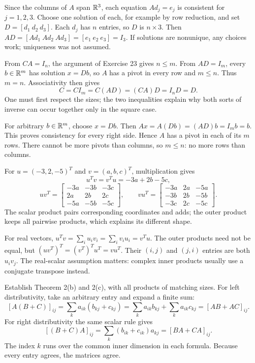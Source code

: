Since the columns of $A$ span $\mathbb{R}^3$, each equation $Ad_j=e_j$ is
consistent for $j=1,2,3$. Choose one solution of each, for example by row
reduction, and set $D=[d_1\ d_2\ d_3]$. Each $d_j$ has $n$ entries,
so $D$ is $n\times3$. Then
$AD=[Ad_1\ Ad_2\ Ad_3]=[e_1\ e_2\ e_3]=I_3$.
If solutions are nonunique, any choices work; uniqueness was not assumed.

From $CA=I_n$, the argument of Exercise 23 gives $n\le m$.
From $AD=I_m$, every $b\in\mathbb{R}^m$ has solution $x=Db$, so $A$ has a pivot
in every row and $m\le n$. Thus $m=n$.
Associativity then gives
\[
 C=C I_m=C(AD)=(CA)D=I_nD=D.
\]
One must first respect the sizes; the two inequalities explain why both
sorts of inverse can occur together only in the square case.

For arbitrary $b\in\mathbb{R}^m$, choose $x=Db$. Then
$Ax=A(Db)=(AD)b=I_mb=b$. This proves consistency for every right side.
Hence $A$ has a pivot in each of its $m$ rows. There cannot be more pivots
than columns, so $m\le n$: no more rows than columns.

For $u=(-3,2,-5)^T$ and $v=(a,b,c)^T$, multiplication gives
\[
 u^Tv=v^Tu=-3a+2b-5c,
\]
\[
 uv^T=\begin{bmatrix}-3a&-3b&-3c\\2a&2b&2c\\-5a&-5b&-5c\end{bmatrix},\qquad
 vu^T=\begin{bmatrix}-3a&2a&-5a\\-3b&2b&-5b\\-3c&2c&-5c\end{bmatrix}.
\]
The scalar product pairs corresponding coordinates and adds; the outer
product keeps all pairwise products, which explains its different shape.

For real vectors, $u^Tv=\sum_i u_iv_i=\sum_i v_iu_i=v^Tu$.
The outer products need not be equal, but
$(uv^T)^T=(v^T)^Tu^T=vu^T$. Their $(i,j)$ and $(j,i)$ entries are
both $u_iv_j$. The real-scalar assumption matters: complex inner products
usually use a conjugate transpose instead.

\goal Establish Theorem 2(b) and 2(c), with all products of matching sizes.
For left distributivity, take an arbitrary entry and expand a finite sum:
\[
 [A(B+C)]_{ij}=\sum_k a_{ik}(b_{kj}+c_{kj})
 =\sum_k a_{ik}b_{kj}+\sum_k a_{ik}c_{kj}
 =[AB+AC]_{ij}.
\]
For right distributivity the same scalar rule gives
\[
 [(B+C)A]_{ij}=\sum_k(b_{ik}+c_{ik})a_{kj}
 =[BA+CA]_{ij}.
\]
The index $k$ runs over the common inner dimension in each formula.
Because every entry agrees, the matrices agree.

